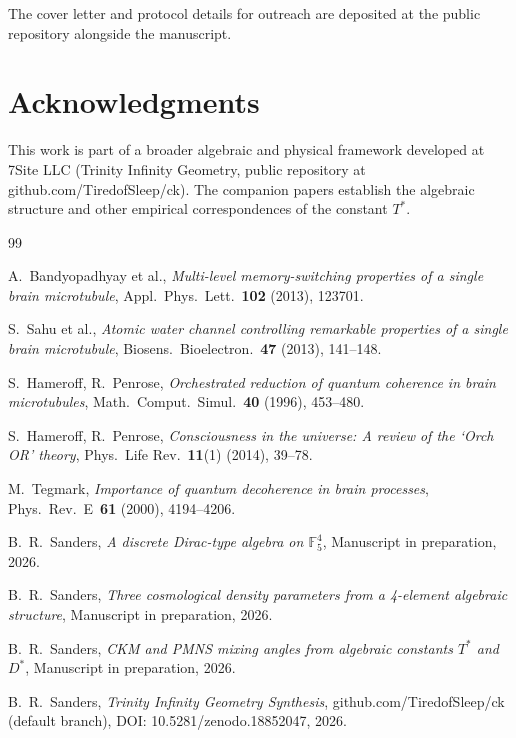\documentclass[11pt,reqno]{amsart}
\theoremstyle{plain}
\theoremstyle{definition}
\theoremstyle{remark}
\begin{document}
The cover letter and protocol details for outreach are deposited at the
public repository alongside the manuscript.

\section*{Acknowledgments}

This work is part of a broader algebraic and physical framework
developed at 7Site LLC (Trinity Infinity Geometry, public repository at
github.com/TiredofSleep/ck). The companion papers
\cite{Sanders2026Dirac, Sanders2026Cosmology, Sanders2026Mixing}
establish the algebraic structure and other empirical correspondences
of the constant $T^{*}$.

\begin{thebibliography}{99}

 A.~Bandyopadhyay et al.,
\emph{Multi-level memory-switching properties of a single brain microtubule},
Appl.~Phys.~Lett.~\textbf{102} (2013), 123701.

 S.~Sahu et al.,
\emph{Atomic water channel controlling remarkable properties of a single brain microtubule},
Biosens.~Bioelectron.~\textbf{47} (2013), 141--148.

 S.~Hameroff, R.~Penrose,
\emph{Orchestrated reduction of quantum coherence in brain microtubules},
Math.~Comput.~Simul.~\textbf{40} (1996), 453--480.

 S.~Hameroff, R.~Penrose,
\emph{Consciousness in the universe: A review of the `Orch OR' theory},
Phys.~Life Rev.~\textbf{11}(1) (2014), 39--78.

 M.~Tegmark,
\emph{Importance of quantum decoherence in brain processes},
Phys.~Rev.~E~\textbf{61} (2000), 4194--4206.

 B.~R.~Sanders,
\emph{A discrete Dirac-type algebra on $\mathbb{F}_5^4$},
Manuscript in preparation, 2026.

 B.~R.~Sanders,
\emph{Three cosmological density parameters from a 4-element algebraic structure},
Manuscript in preparation, 2026.

 B.~R.~Sanders,
\emph{CKM and PMNS mixing angles from algebraic constants $T^{*}$ and $D^{*}$},
Manuscript in preparation, 2026.

 B.~R.~Sanders,
\emph{Trinity Infinity Geometry Synthesis},
github.com/TiredofSleep/ck (default branch),
DOI: 10.5281/zenodo.18852047, 2026.

\end{thebibliography}
\end{document}
